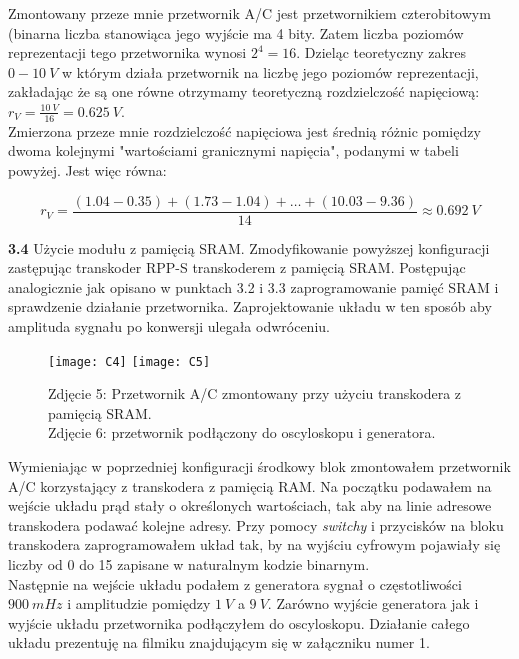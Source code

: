 \documentclass[14pt, table]{extarticle}
\begin{document}
Zmontowany przeze mnie przetwornik A/C jest przetwornikiem czterobitowym (binarna liczba stanowiąca jego wyjście ma 4 bity. Zatem liczba poziomów reprezentacji tego przetwornika wynosi $2^4 = 16$. Dzieląc teoretyczny zakres $0 - 10 \ V$ w którym działa przetwornik na liczbę jego poziomów reprezentacji, zakładając że są one równe otrzymamy teoretyczną rozdzielczość napięciową: $r_V = \frac{10 \ V}{16} = 0.625 \ V$. \\

Zmierzona przeze mnie rozdzielczość napięciowa jest średnią różnic pomiędzy dwoma kolejnymi "wartościami granicznymi napięcia", podanymi w tabeli powyżej.
Jest więc równa:

$$ r_V = \frac{(1.04 - 0.35) + (1.73 - 1.04) + \ldots + (10.03 - 9.36)}{14} \approx 0.692 \ V $$

\newpage
\textbf{3.4} Użycie modułu z pamięcią SRAM. Zmodyfikowanie powyższej konfiguracji zastępując transkoder RPP-S transkoderem z pamięcią SRAM. Postępując analogicznie jak opisano w punktach 3.2 i 3.3 zaprogramowanie pamięć SRAM i sprawdzenie działanie przetwornika. Zaprojektowanie układu w ten sposób aby amplituda sygnału po konwersji ulegała odwróceniu. \\

\begin{figure}[H]
\texttt{[image: C4]}
\texttt{[image: C5]}
\centering
\captionsetup{labelformat=empty}
\caption{Zdjęcie 5: Przetwornik A/C zmontowany przy użyciu transkodera z pamięcią SRAM. \\ Zdjęcie 6: przetwornik podłączony do oscyloskopu i generatora.}
\end{figure}

Wymieniając w poprzedniej konfiguracji środkowy blok zmontowałem przetwornik A/C korzystający z transkodera z pamięcią RAM. Na początku podawałem na wejście układu prąd stały o określonych wartościach, tak aby na linie adresowe transkodera podawać kolejne adresy. Przy pomocy \textit{switchy} i przycisków na bloku transkodera zaprogramowałem układ tak, by na wyjściu cyfrowym pojawiały się liczby od 0 do 15 zapisane w naturalnym kodzie binarnym. \\

Następnie na wejście układu podałem z generatora sygnał o częstotliwości $900 \ mHz$ i amplitudzie pomiędzy $1 \ V$ a $9 \ V$. Zarówno wyjście generatora jak i wyjście układu przetwornika podłączyłem do oscyloskopu. Działanie całego układu prezentuję na filmiku znajdującym się w załączniku numer 1.
\end{document}
